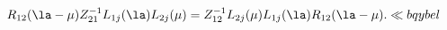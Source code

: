 \begin{equation}
{R}_{12}(\la-\mu)Z_{21}^{-1}L_{1j}(\la)L_{2j}(\mu)
= Z_{12}^{-1}L_{2j}(\mu) L_{1j}(\la){R}_{12}(\la-\mu).
\ll{bqybel}\end{equation}

